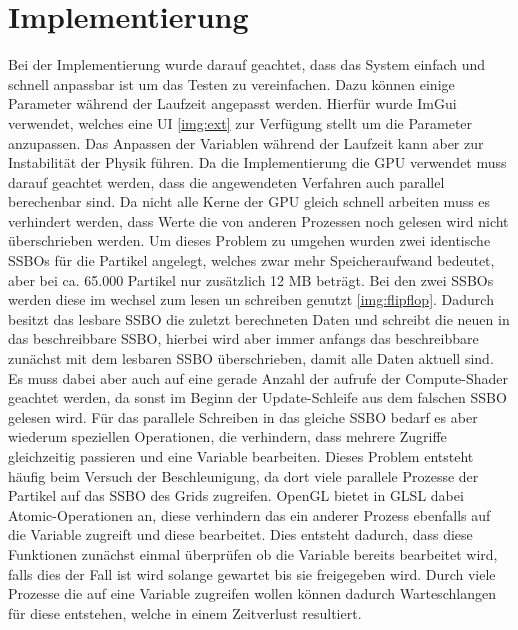 \documentclass[intern,palatino]{cgBA}
\begin{document}
\section{Implementierung}\label{imp}

Bei der Implementierung wurde darauf geachtet, dass das System einfach und schnell anpassbar ist um das Testen zu vereinfachen.
Dazu können einige Parameter während der Laufzeit angepasst werden. Hierfür wurde ImGui \cite{ocornut} verwendet, welches eine UI \ref{img:ext} zur Verfügung stellt um die Parameter anzupassen.
Das Anpassen der Variablen während der Laufzeit kann aber zur Instabilität der Physik führen.
\newline
Da die Implementierung die GPU verwendet muss darauf geachtet werden, dass die angewendeten Verfahren auch parallel berechenbar sind. Da nicht alle Kerne der GPU gleich schnell arbeiten muss es verhindert werden, dass Werte die von anderen Prozessen noch gelesen wird nicht überschrieben werden.
Um dieses Problem zu umgehen wurden zwei identische SSBOs für die Partikel angelegt, welches zwar mehr Speicheraufwand bedeutet, aber bei ca. 65.000 Partikel nur zusätzlich 12 MB beträgt. Bei den zwei SSBOs werden diese im wechsel zum lesen un schreiben genutzt \ref{img:flipflop}. Dadurch besitzt das lesbare SSBO die zuletzt berechneten Daten und schreibt die neuen in das beschreibbare SSBO, hierbei wird aber immer anfangs das beschreibbare zunächst mit dem lesbaren SSBO überschrieben, damit alle Daten aktuell sind.
Es muss dabei aber auch auf eine gerade Anzahl der aufrufe der Compute-Shader geachtet werden, da sonst im Beginn der Update-Schleife aus dem falschen SSBO gelesen wird.
\newline
Für das parallele Schreiben in das gleiche SSBO bedarf es aber wiederum speziellen Operationen, die verhindern, dass mehrere Zugriffe gleichzeitig passieren und eine Variable bearbeiten. Dieses Problem entsteht häufig beim Versuch der Beschleunigung, da dort viele parallele Prozesse der Partikel auf das SSBO des Grids zugreifen.
\newline
OpenGL bietet in GLSL dabei Atomic-Operationen an, diese verhindern das ein anderer Prozess ebenfalls auf die Variable zugreift und diese bearbeitet. Dies entsteht dadurch, dass diese Funktionen zunächst einmal überprüfen ob die Variable bereits bearbeitet wird, falls dies der Fall ist wird solange gewartet bis sie freigegeben wird. Durch viele Prozesse die auf eine Variable zugreifen wollen können dadurch Warteschlangen für diese entstehen, welche in einem Zeitverlust resultiert.
\end{document}
